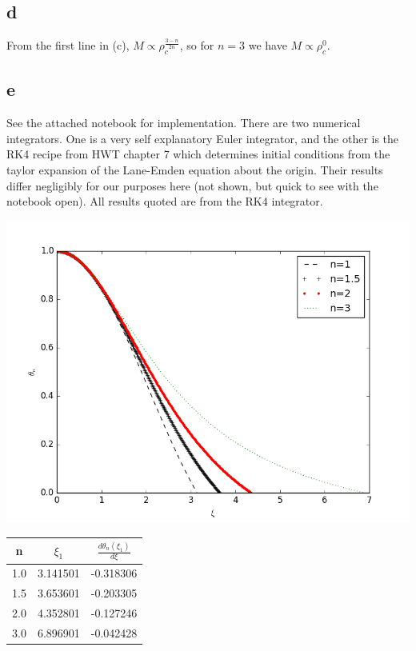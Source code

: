 \documentclass[12pt]{article}
\begin{document}
\subsection*{d}

From the first line in (c), \(M\propto \rho_c^{\frac{3-n}{2n}}\), so for \(n=3\) we have \(M\propto \rho_c^0\).

\subsection*{e}

See the attached notebook for implementation. There are two numerical integrators. One is a very self explanatory Euler integrator, and the other is the RK4 recipe from HWT chapter 7 which determines initial conditions from the taylor expansion of the Lane-Emden equation about the origin. Their results differ negligibly for our purposes here (not shown, but quick to see with the notebook open). All results quoted are from the RK4 integrator.

\begin{center}
\includegraphics[scale=.5]{theta_xi.png}
\end{center}


\begin{center}

\begin{tabular}{ccc}
\toprule
   n &   \( \xi_1 \) &  \( \frac{d\theta_n (\xi_1)}{d\xi} \) \\
\midrule
 1.0 &      3.141501 &                             -0.318306 \\
 1.5 &      3.653601 &                             -0.203305 \\
 2.0 &      4.352801 &                             -0.127246 \\
 3.0 &      6.896901 &                             -0.042428 \\
\bottomrule
\end{tabular}

\end{center}
\end{document}
